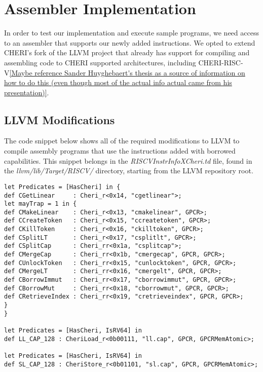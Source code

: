 \chapter{Assembler Implementation}
In order to test our implementation and execute sample programs, we need access to an assembler that supports our newly added instructions. We opted to extend CHERI's fork of the LLVM project that already has support for compiling and assembling code to CHERI supported architectures, including CHERI-RISC-V\ref{Maybe reference Sander Huyghebaert's thesis as a source of information on how to do this (even though most of the actual info actual came from his presentation)}.

\section{LLVM Modifications}
The code snippet below shows all of the required modifications to LLVM to compile assembly programs that use the instructions added with borrowed capabilities. This snippet belongs in the \textit{RISCVInstrInfoXCheri.td} file, found in the \textit{llvm/lib/Target/RISCV/} directory, starting from the LLVM repository root.


\begin{verbatim}
let Predicates = [HasCheri] in {
def CGetLinear     : Cheri_r<0x14, "cgetlinear">;
let mayTrap = 1 in {
def CMakeLinear    : Cheri_r<0x13, "cmakelinear", GPCR>;
def CCreateToken   : Cheri_r<0x15, "ccreatetoken", GPCR>;
def CKillToken     : Cheri_r<0x16, "ckilltoken", GPCR>;
def CSplitLT       : Cheri_r<0x17, "csplitlt", GPCR>;
def CSplitCap      : Cheri_rr<0x1a, "csplitcap">;
def CMergeCap      : Cheri_rr<0x1b, "cmergecap", GPCR, GPCR>;
def CUnlockToken   : Cheri_rr<0x15, "cunlocktoken", GPCR, GPCR>;
def CMergeLT       : Cheri_rr<0x16, "cmergelt", GPCR, GPCR>;
def CBorrowImmut   : Cheri_rr<0x17, "cborrowimmut", GPCR, GPCR>;
def CBorrowMut     : Cheri_rr<0x18, "cborrowmut", GPCR, GPCR>;
def CRetrieveIndex : Cheri_rr<0x19, "cretrieveindex", GPCR, GPCR>;
}
}

let Predicates = [HasCheri, IsRV64] in
def LL_CAP_128 : CheriLoad_r<0b00111, "ll.cap", GPCR, GPCRMemAtomic>;

let Predicates = [HasCheri, IsRV64] in
def SL_CAP_128 : CheriStore_r<0b01101, "sl.cap", GPCR, GPCRMemAtomic>;
\end{verbatim}

